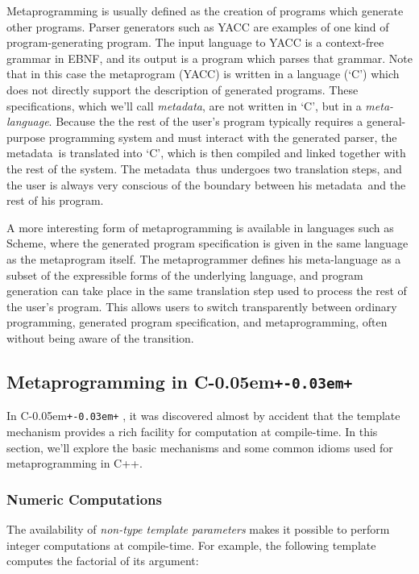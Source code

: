 \documentclass{kapproc}
\newcommand{\Cpp}{C\kern-0.05em\texttt{+\kern-0.03em+}%
}
\newcommand{\mping}{meta\-pro\-gram\-ming}
\newcommand{\mpgm}{meta\-pro\-gram}
\newcommand{\mdat}{meta\-data}
\begin{document}
Metaprogramming is usually defined as the creation of programs which
generate other programs. Parser generators such as YACC are examples
of one kind of program-generating program. The input language to YACC
is a context-free grammar in EBNF, and its output is a program which
parses that grammar. Note that in this case the \mpgm{} (YACC) is
written in a language (`C') which does not directly support the
description of generated programs. These specifications, which we'll
call \emph{\mdat}, are not written in `C', but in a
\emph{meta-language}. Because the the rest of the user's program
typically requires a general-purpose programming system and must
interact with the generated parser, the \mdat\ is translated into
`C', which is then compiled and linked together with the rest of the
system. The \mdat\ thus undergoes two translation steps, and the
user is always very conscious of the boundary between his \mdat\
and the rest of his program.

A more interesting form of \mping{} is available in languages
such as Scheme, where the generated program specification is given in
the same language as the \mpgm{} itself. The metaprogrammer
defines his meta-language as a subset of the expressible forms of the
underlying language, and program generation can take place in the same
translation step used to process the rest of the user's program. This
allows users to switch transparently between ordinary programming,
generated program specification, and \mping{}, often without
being aware of the transition.

\subsection{Metaprogramming in \Cpp{}}

In \Cpp, it was discovered almost by accident that the template
mechanism provides a rich facility for computation at compile-time. In
this section, we'll explore the basic mechanisms and some common
idioms used for metaprogramming in C++.

\subsubsection{Numeric Computations}

The availability of \emph{non-type template parameters} makes it
possible to perform integer computations at compile-time. For example,
the following template computes the factorial of its
argument:
\end{document}
